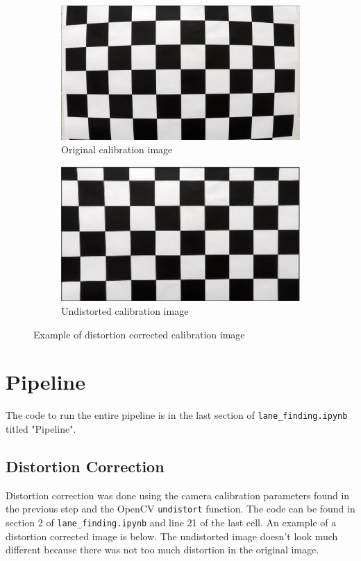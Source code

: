 \documentclass[12pt]{article}
\begin{document}
\begin{figure}[h]
\centering
\begin{subfigure}{.5\textwidth}
  \centering
  \includegraphics[width=1\linewidth]{../camera_cal/calibration1.jpg}
  \caption{Original calibration image}
\end{subfigure}%
\begin{subfigure}{.5\textwidth}
  \centering
  \includegraphics[width=1\linewidth]{undistorted_calibration.png}
  \caption{Undistorted calibration image}
\end{subfigure}
\caption{Example of distortion corrected calibration image}
\label{fig:distortion_correction_calibration}
\end{figure}

\section{Pipeline}

The code to run the entire pipeline is in the last section of \texttt{lane\_finding.ipynb} titled "Pipeline".

\subsection{Distortion Correction}
Distortion correction was done using the camera calibration parameters found in the previous step and the OpenCV \texttt{undistort} function. The code can be found in section 2 of \texttt{lane\_finding.ipynb} and line 21 of the last cell. An example of a distortion corrected image is below. The undistorted image doesn't look much different because there was not too much distortion in the original image.
\end{document}
